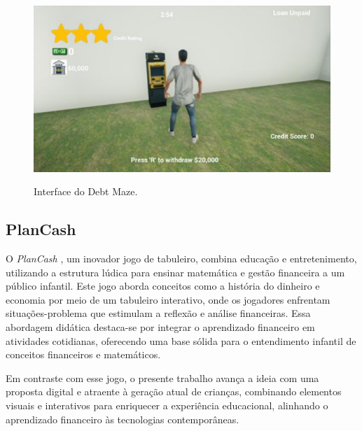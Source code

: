 \begin{figure}[ht]
	\centering
	\caption{Interface do Debt Maze.}
	\includegraphics[scale=0.8]{Textuais/Pictures/debt-maze-2.png}
	\label{fig:debt-maze-2}
\end{figure}

\subsection{PlanCash}
O \textit{PlanCash} \cite{mariano2020educaccao}, um inovador jogo de tabuleiro, combina educação e entretenimento, utilizando a estrutura lúdica para ensinar matemática e gestão financeira a um público infantil. Este jogo aborda conceitos como a história do dinheiro e economia por meio de um tabuleiro interativo, onde os jogadores enfrentam situações-problema que estimulam a reflexão e análise financeiras. Essa abordagem didática destaca-se por integrar o aprendizado financeiro em atividades cotidianas, oferecendo uma base sólida para o entendimento infantil de conceitos financeiros e matemáticos.

Em contraste com esse jogo, o presente trabalho avança a ideia com uma proposta digital e atraente à geração atual de crianças, combinando elementos visuais e interativos para enriquecer a experiência educacional, alinhando o aprendizado financeiro às tecnologias contemporâneas.

